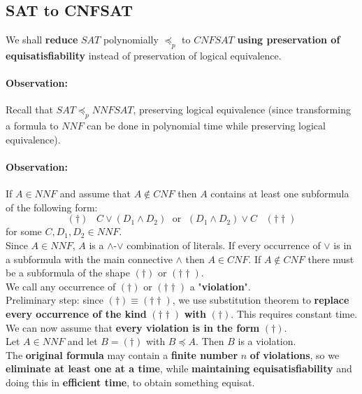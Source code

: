 	\newpage

	\subsection{SAT to CNFSAT}
	We shall \textbf{reduce} $SAT$ polynomially $\preceq_p$ to $CNFSAT$ \textbf{using preservation of equisatisfiability} instead of preservation of logical equivalence.\\

	\paragraph{Observation:} Recall that $SAT \preceq_p NNFSAT$, preserving logical equivalence (since transforming a formula to $NNF$ can be done in polynomial time while preserving logical equivalence).\\

	\paragraph{Observation:} If $A \in NNF$ and assume that $A \notin CNF$ then $A$ contains at least one subformula of the following form:
	$$ (\dag) \;\;\; C \vee (D_1 \wedge D_2) \; \text{ or } \;  (D_1 \wedge D_2) \vee C \;\;\; (\dag \dag) $$
	for some $C, D_1, D_2 \in NNF$.\\

	Since $A \in NNF$, $A$ is a $\wedge$-$\vee$ combination of literals. If every occurrence of $\vee$ is in a subformula with the main connective $\wedge$ then $A \in CNF$. If $A \notin CNF$ there must be a subformula of the shape $(\dag)$ or $(\dag \dag)$.\\

	We call any occurrence of $(\dag)$ or $(\dag \dag)$ a "\textbf{violation}".\\
	Preliminary step: since $(\dag) \equiv (\dag \dag)$, we use substitution theorem to \textbf{replace every occurrence of the kind} $(\dag \dag)$ \textbf{with} $(\dag)$. This requires constant time.\\

	We can now assume that \textbf{every violation is in the form} $(\dag)$.\\

	Let $A \in NNF$ and let $B = (\dag)$ with $B \preceq A$. Then $B$ is a violation.\\

	The \textbf{original formula} may contain a \textbf{finite number} $n$ \textbf{of violations}, so we \textbf{eliminate at least one at a time}, while \textbf{maintaining equisatisfiability} and doing this in \textbf{efficient time}, to obtain something equisat.\\

